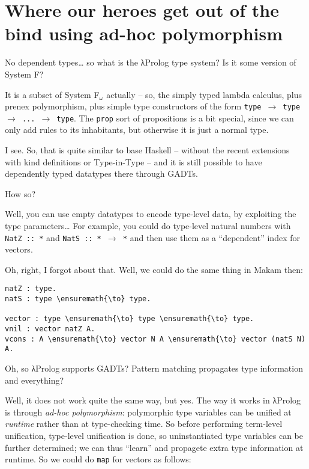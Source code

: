 \section{Where our heroes get out of the bind using ad-hoc
polymorphism}\label{where-our-heroes-get-out-of-the-bind-using-ad-hoc-polymorphism}

\heroSTUDENT{} No dependent types\ldots{} so what is the \foreignlanguage{greek}{λ}Prolog type system?
Is it some version of System F?

\heroADVISOR{} It is a subset of System F\(_\omega\) actually -- so, the
simply typed lambda calculus, plus prenex polymorphism, plus simple type
constructors of the form
\texttt{type\ \ensuremath{\to}\ type\ \ensuremath{\to}\ ...\ \ensuremath{\to}\ type}.
The \texttt{prop} sort of propositions is a bit special, since we can
only add rules to its inhabitants, but otherwise it is just a normal
type.

\heroSTUDENT{} I see. So, that is quite similar to base Haskell -- without the
recent extensions with kind definitions \citep{yorgey2012giving} or
Type-in-Type \citep{weirich2013system} -- and it is still possible to
have dependently typed datatypes there through GADTs.

\heroADVISOR{} How so?

\heroSTUDENT{} Well, you can use empty datatypes to encode type-level data, by
exploiting the type parameters\ldots{} For example, you could do
type-level natural numbers with \texttt{NatZ\ ::\ *} and
\texttt{NatS\ ::\ *\ \ensuremath{\to}\ *} and then use them as a
``dependent'' index for vectors.

\heroADVISOR{} Oh, right, I forgot about that. Well, we could do the same
thing in Makam then:

\begin{verbatim}
natZ : type.
natS : type \ensuremath{\to} type.

vector : type \ensuremath{\to} type \ensuremath{\to} type.
vnil : vector natZ A.
vcons : A \ensuremath{\to} vector N A \ensuremath{\to} vector (natS N) A.
\end{verbatim}

\heroSTUDENT{} Oh, so \foreignlanguage{greek}{λ}Prolog supports GADTs? Pattern matching propagates type
information and everything?

\heroADVISOR{} Well, it does not work quite the same way, but yes. The way it
works in \foreignlanguage{greek}{λ}Prolog is through \emph{ad-hoc polymorphism}: polymorphic type
variables can be unified at \emph{runtime} rather than at type-checking
time. So before performing term-level unification, type-level
unification is done, so uninstantiated type variables can be further
determined; we can thus ``learn'' and propagete extra type information
at runtime. So we could do \texttt{map} for vectors as follows:

